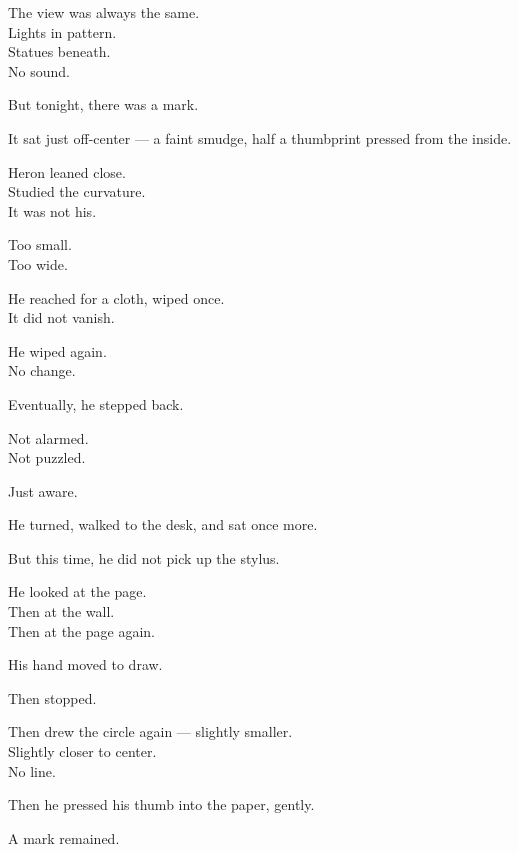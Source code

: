 \documentclass[12pt]{article}
\begin{document}
\vspace{1em}

The view was always the same.\\
Lights in pattern.\\
Statues beneath.\\
No sound.

But tonight, there was a mark.

\vspace{1em}

It sat just off-center — a faint smudge, half a thumbprint pressed from the inside.

Heron leaned close.\\
Studied the curvature.\\
It was not his.

Too small.\\
Too wide.

\vspace{1em}

He reached for a cloth, wiped once.\\
It did not vanish.

He wiped again.\\
No change.

Eventually, he stepped back.

Not alarmed.\\
Not puzzled.

Just aware.

\vspace{1em}

He turned, walked to the desk, and sat once more.

But this time, he did not pick up the stylus.

He looked at the page.\\
Then at the wall.\\
Then at the page again.

\vspace{1em}

His hand moved to draw.

Then stopped.

Then drew the circle again — slightly smaller.\\
Slightly closer to center.\\
No line.

Then he pressed his thumb into the paper, gently.

A mark remained.

\vspace{1em}
\end{document}
